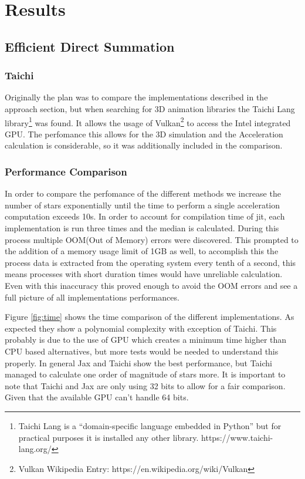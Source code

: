 \documentclass[a4paper, 11pt]{article}         %
\begin{document}
\section{Results}

\subsection{Efficient Direct Summation}
\subsubsection{Taichi}
Originally the plan was to compare the implementations described in the approach section, but when searching for 3D animation libraries the 
Taichi Lang library\footnote{Taichi Lang is a ``domain-specific language embedded in Python'' but for practical purposes it is installed any other library.  https://www.taichi-lang.org/}
 was found. It allows the usage of Vulkan\footnote{Vulkan Wikipedia Entry: https://en.wikipedia.org/wiki/Vulkan} to access the Intel integrated GPU.
The perfomance this allows for the 3D simulation and the Acceleration calculation is considerable, so it was additionally included in the comparison. 

\subsubsection{Performance Comparison}
In order to compare the perfomance of the different methods we increase the number of stars exponentially until the time to perform a single acceleration computation 
exceeds 10s. In order to account for compilation time of jit, each implementation is run three times and the median is calculated.
During this process multiple OOM(Out of Memory) errors were discovered.
This prompted to the addition of a memory usage limit of 1GB as well, to accomplish this the process data is extracted from the operating system 
every tenth of a second, this means processes with short duration times would have unreliable calculation. Even with this inaccuracy this proved
enough to avoid the OOM errors and see a full picture of all implementations performances.

Figure \ref{fig:time} shows the time comparison of the different implementations. As expected they show a polynomial complexity with exception of Taichi.
This probably is due to the use of GPU which creates a minimum time higher than CPU based alternatives, but more tests would be needed to understand this properly.
In general Jax and Taichi show the best performance, but Taichi managed to calculate one order of magnitude of stars more. 
It is important to note that Taichi and Jax are only using 32 bits to allow for a fair comparison. Given that the available GPU can't handle 64 bits.
\end{document}
